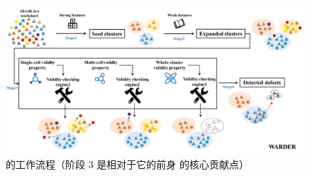 \begin{figure}[tp]    
    \centering
    \includegraphics[width=\textwidth]{figure/figure1.pdf}
    \caption{\wa 的工作流程（阶段 3 是相对于它的前身 \cu 的核心贡献点）}
    \label{figure1}
\end{figure}